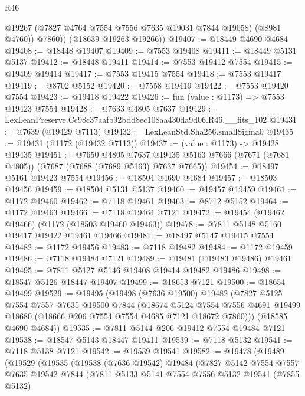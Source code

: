 \begin{lexlean}{R46}
\begin{coremodule}
            @19267
            (@7827 @4764 @7554 @7556 @7635 @19031 @7844 @19058)
            (@8981 @4760))
          @7860))
      (@18639 @19263 @19266))
@19407 := @18449 @4690 @4684
@19408 := @18448 @19407
@19409 := @7553 @19408
@19411 := @18449 @5131 @5137
@19412 := @18448 @19411
@19414 := @7553 @19412 @7554
@19415 := @19409 @19414
@19417 := @7553 @19415 @7554
@19418 := @7553 @19417
@19419 := @8702 @5152
@19420 := @7558 @19419
@19422 := @7553 @19420 @7554
@19423 := @19418 @19422
@19426 := fun (value : @1173) => @7553 @19423 @7554
@19428 := @7633 @4805 @7637
@19429 := LexLeanPreserve.Cc98c37aafb92bdd8ec108aa430da9d06.R46.__fits_102
@19431 := @7639 (@19429 @7113)
@19432 := LexLeanStd.Sha256.smallSigma0
@19435 := @19431 (@1172 (@19432 @7113))
@19437 := (value : @1173) -> @19428 @19435
@19451 := @7650
    @4805
    @7637
    @19435
    @5163
    @7666
    (@7671 (@7681 @4805))
    (@7687 (@7688 (@7689 @5163) @7637 @7665))
@19454 := @18497 @5161 @19423 @7554
@19456 := @18504 @4690 @4684
@19457 := @18503 @19456
@19459 := @18504 @5131 @5137
@19460 := @19457 @19459
@19461 := @1172 @19460
@19462 := @7118 @19461
@19463 := @8712 @5152
@19464 := @1172 @19463
@19466 := @7118 @19464 @7121
@19472 := @19454 (@19462 @19466) (@1172 (@18503 @19460 @19463))
@19478 := @7811 @5148 @5160 @19417 @19422 @19461 @19466
@19481 := @18497 @5147 @19415 @7554
@19482 := @1172 @19456
@19483 := @7118 @19482
@19484 := @1172 @19459
@19486 := @7118 @19484 @7121
@19489 := @19481 (@19483 @19486) @19461
@19495 := @7811 @5127 @5146 @19408 @19414 @19482 @19486
@19498 := @18547 @5126 @18447 @19407
@19499 := @18653 @7121
@19500 := @18654 @19499
@19529 := @19495
    (@19498
      (@7636 @19500)
      @19482
      (@7827
        @5125
        @7554
        @7557
        @7635
        @19500
        @7844
        (@18674
          @5124
          @7554
          @7556
          @4691
          @19499
          @18680
          (@18666 @206 @7554 @7554 @4685 @7121 @18672 @7860)))
      (@18585 @4690 @4684))
@19535 := @7811 @5144 @206 @19412 @7554 @19484 @7121
@19538 := @18547 @5143 @18447 @19411
@19539 := @7118 @5132
@19541 := @7118 @5138 @7121
@19542 := @19539 @19541
@19582 := @19478
    (@19489
      (@19529
        (@19535
          (@19538
            (@7636 @19542)
            @19484
            (@7827
              @5142
              @7554
              @7557
              @7635
              @19542
              @7844
              (@7811
                @5133
                @5141
                @7554
                @7556
                @5132
                @19541
                (@7855 @5132)

\end{coremodule}
\end{lexlean}
